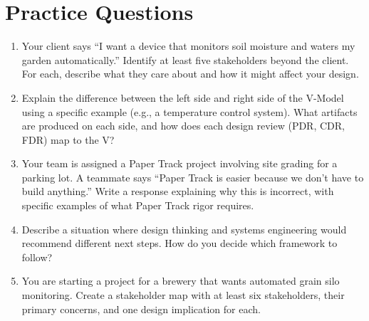 \section{Practice Questions}
\begin{enumerate}[leftmargin=1.5em]
\item Your client says ``I want a device that monitors soil moisture and waters my garden automatically.'' Identify at least five stakeholders beyond the client. For each, describe what they care about and how it might affect your design.
\item Explain the difference between the left side and right side of the V-Model using a specific example (e.g., a temperature control system). What artifacts are produced on each side, and how does each design review (PDR, CDR, FDR) map to the V?
\item Your team is assigned a Paper Track project involving site grading for a parking lot. A teammate says ``Paper Track is easier because we don't have to build anything.'' Write a response explaining why this is incorrect, with specific examples of what Paper Track rigor requires.
\item Describe a situation where design thinking and systems engineering would recommend different next steps. How do you decide which framework to follow?
\item You are starting a project for a brewery that wants automated grain silo monitoring. Create a stakeholder map with at least six stakeholders, their primary concerns, and one design implication for each.
\end{enumerate}


